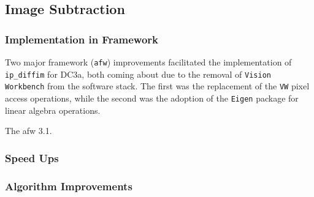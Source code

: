 
\subsection{Image Subtraction}

\subsubsection{Implementation in Framework}

Two major framework ({\tt afw}) improvements facilitated the
implementation of {\tt ip\_diffim} for DC3a, both coming about due to
the removal of {\tt Vision Workbench} from the software stack.  The
first was the replacement of the {\tt VW} pixel access operations,
while the second was the adoption of the {\tt Eigen} package for
linear algebra operations.  

The afw 3.1.

\subsubsection{Speed Ups}

\subsubsection{Algorithm Improvements}
